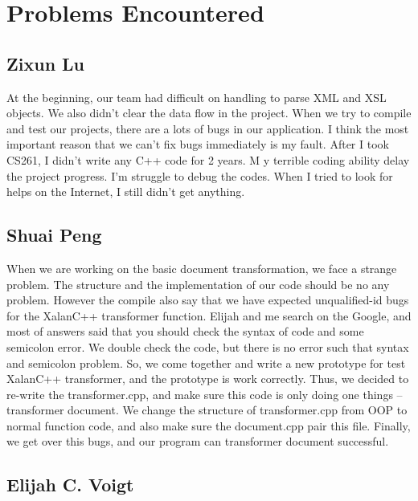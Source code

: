 \section{Problems Encountered}

\subsection{Zixun Lu}

At the beginning, our team had difficult on handling to parse XML and XSL objects.
We also didn’t clear the data flow in the project.
When we try to compile and test our projects, there are a lots of bugs in our application. 
I think the most important reason that we can’t fix bugs immediately is my fault. 
After I took CS261, I didn’t write any C++ code for 2 years. M
y terrible coding ability delay the project progress. I’m struggle to debug the codes. 
When I tried to look for helps on the Internet, I still didn’t get anything. 

\subsection{Shuai Peng}

When we are working on the basic document transformation, we face a strange problem.
The structure and the implementation of our code should be no any problem.
However the compile also say that we have expected unqualified-id bugs for the XalanC++ transformer function.
Elijah and me search on the Google, and most of answers said that you should check the syntax of code and some semicolon error.
We double check the code, but there is no error such that syntax and semicolon problem.
So, we come together and write a new prototype for test XalanC++ transformer, and the prototype is work correctly.
Thus, we decided to re-write the transformer.cpp, and make sure this code is only doing one things -- transformer document.
We change the structure of transformer.cpp from OOP to normal function code, and also make sure the document.cpp pair this file.
Finally, we get over this bugs, and our program can transformer document successful. 

\subsection{Elijah C. Voigt}

